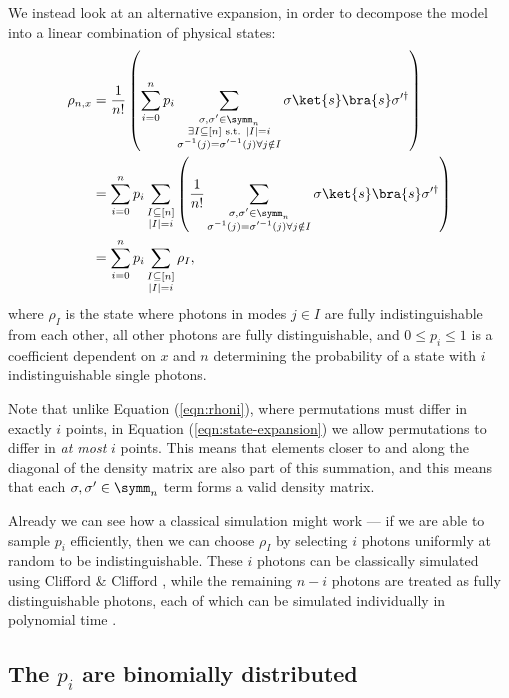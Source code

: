 We instead look at an alternative expansion, in order to decompose the model into a linear combination of physical states:
\begin{align}
\rho_{n,x} &= \frac{1}{n!}\left(\sum_{i=0}^np_i\sum_{\substack{\sigma,\sigma'\in\symm_n\\\exists I\subseteq [n] \textrm{ s.t. } |I|=i\\\sigma^{-1}(j)=\sigma'^{-1}(j)\forall j \notin I}}\sigma\ket{s}\bra{s}\sigma'^\dagger\right)\label{eqn:state-expansion}\\
&= \sum_{i=0}^np_i\sum_{\substack{I\subseteq[n]\\|I|=i}}\left(\frac{1}{n!}\sum_{\substack{\sigma,\sigma'\in\symm_n\\\sigma^{-1}(j)=\sigma'^{-1}(j)\forall j \notin I}}\sigma\ket{s}\bra{s}\sigma'^\dagger\right)\\
&= \sum_{i=0}^np_i\sum_{\substack{I\subseteq[n]\\|I|=i}}\rho_I, \label{eq:newrho}
\end{align}
where $\rho_I$ is the state where photons in modes $j \in I$ are fully indistinguishable from each other, all other photons are fully distinguishable, and $0 \leq p_i \leq 1$ is a coefficient dependent on $x$ and $n$ determining the probability of a state with $i$ indistinguishable single photons.

Note that unlike Equation (\ref{eqn:rhoni}), where permutations must differ in exactly $i$ points, in Equation (\ref{eqn:state-expansion}) we allow permutations to differ in \emph{at most} $i$ points. 
This means that elements closer to and along the diagonal of the density matrix are also part of this summation, and this means that each $\sigma,\sigma' \in \symm_n$ term forms a valid density matrix.

Already we can see how a classical simulation might work --- if we are able to sample $p_i$ efficiently, then we can choose $\rho_I$ by selecting $i$ photons uniformly at random to be indistinguishable. 
These $i$ photons can be classically simulated using Clifford \& Clifford \cite{clifford2017}, while the remaining $n-i$ photons are treated as fully distinguishable photons, each of which can be simulated individually in polynomial time \cite{aaronson2014,neville2017}.


\subsection{The $p_i$ are binomially distributed}
\label{sec:understanding-pi}

